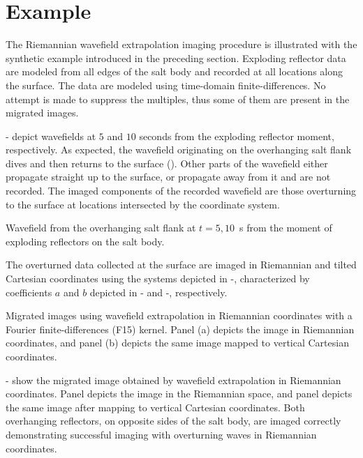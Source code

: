 \section{Example}
The Riemannian wavefield extrapolation imaging procedure is illustrated with the synthetic example introduced in the preceding section. Exploding reflector data are modeled from all edges of the salt body and recorded at all locations along the surface. The data are modeled using time-domain finite-differences. No attempt is made to suppress the multiples, thus some of them are present in the migrated images. 
\par
{}- depict wavefields at $5$ and $10$ seconds from the exploding reflector moment, respectively. As expected, the wavefield originating on the overhanging salt flank dives and then returns to the surface (). Other parts of the wavefield either propagate straight up to the surface, or propagate away from it and are not recorded. The imaged components of the recorded wavefield are those overturning to the surface at locations intersected by the coordinate system.


{Wavefield from the overhanging salt flank at $t=5,10$~s from the moment of exploding reflectors on the salt body.}


The overturned data collected at the surface are imaged in Riemannian and tilted Cartesian coordinates using the systems depicted in -, characterized by coefficients $a$ and $b$ depicted in - and -, respectively.

{Migrated images using wavefield extrapolation in Riemannian coordinates with a Fourier finite-differences (F15) kernel. Panel (a) depicts the image in Riemannian coordinates, and panel (b) depicts the same image mapped to vertical Cartesian coordinates.}

- show the migrated image obtained by wavefield extrapolation in Riemannian coordinates. Panel  depicts the image in the Riemannian space, and panel  depicts the same image after mapping to vertical Cartesian coordinates. Both overhanging reflectors, on opposite sides of the salt body, are imaged correctly demonstrating successful imaging with overturning waves in Riemannian coordinates.

